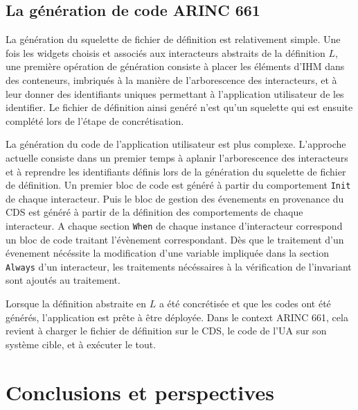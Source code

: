 \documentclass{ihm}
\begin{document}
\subsection{La génération de code ARINC 661}

La génération du  squelette de fichier de  définition est relativement
simple.  Une fois  les widgets  choisis et  associés aux  interacteurs
abstraits de la  définition $L$, une première  opération de génération
consiste à placer les éléments  d'IHM dans des conteneurs, imbriqués à
la manière  de l'arborescence des  interacteurs, et à leur  donner des
identifiants  uniques permettant  à l'application  utilisateur de  les
identifier.  Le  fichier  de   définition  ainsi  genéré  n'est  qu'un
squelette qui est ensuite complété lors de l'étape de concrétisation.

La  génération   du  code   de  l'application  utilisateur   est  plus
complexe. L'approche actuelle consiste dans un premier temps à aplanir
l'arborescence  des  interacteurs  et  à  reprendre  les  identifiants
définis lors de  la génération du squelette de  fichier de définition.
Un  premier  bloc  de  code   est  généré  à  partir  du  comportement
\lstinline$Init$ de chaque  interacteur.  Puis le bloc  de gestion des
évenements en provenance  du CDS est généré à partir  de la définition
des   comportements  de   chaque   interacteur.    A  chaque   section
\lstinline$When$ de  chaque instance d'interacteur correspond  un bloc
de code traitant l'évènement correspondant. Dès que le traitement d'un
évenement nécéssite  la modification d'une variable  impliquée dans la
section   \lstinline$Always$   d'un   interacteur,   les   traitements
nécéssaires  à   la  vérification  de  l'invariant   sont  ajoutés  au
traitement.

Lorsque la  définition abstraite en $L$  a été concrétisée et  que les
codes ont été  générés, l'application est prête à  être déployée. Dans
le context ARINC 661, cela revient  à charger le fichier de définition
sur le CDS,  le code de l'UA  sur son système cible, et  à exécuter le
tout.

\section{Conclusions et perspectives}
\label{sec:conclusion}


\small


\end{document}
